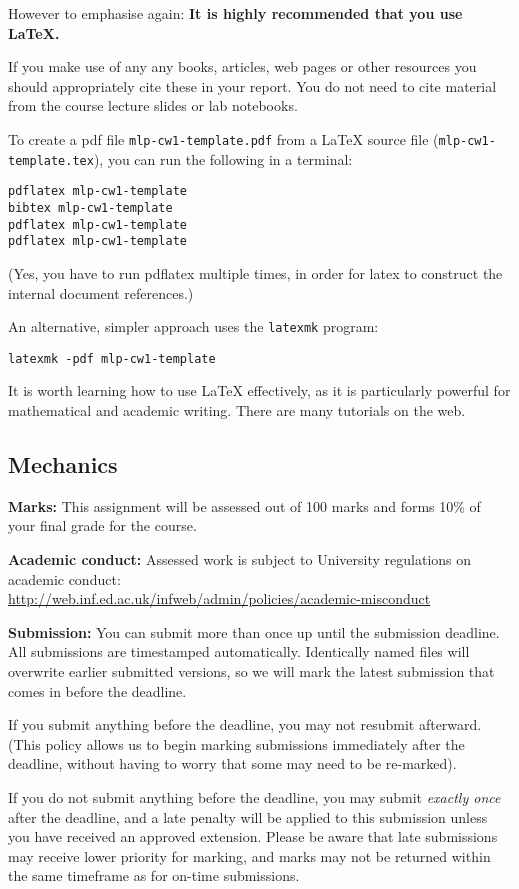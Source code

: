\documentclass[11pt,]{article}
\begin{document}
However to emphasise again: \textbf{It is highly recommended that you use LaTeX.}

If you make use of any any books, articles, web pages or other resources
you should appropriately cite these in your report. You do not need to
cite material from the course lecture slides or lab notebooks.

To create a pdf file \verb+mlp-cw1-template.pdf+ from a LaTeX source file (\verb+mlp-cw1-template.tex+), you can run the following in a terminal:
\begin{verbatim}
pdflatex mlp-cw1-template
bibtex mlp-cw1-template
pdflatex mlp-cw1-template
pdflatex mlp-cw1-template
\end{verbatim}
(Yes, you have to run pdflatex multiple times, in order  for latex to construct the internal document references.)

An alternative, simpler approach uses the \verb+latexmk+ program:
\begin{verbatim}
latexmk -pdf mlp-cw1-template
\end{verbatim}

It is worth learning how to use LaTeX effectively, as it is particularly powerful for mathematical and academic writing.  There are many tutorials on the web.


\subsection{Mechanics}
\label{sec:mechanics}

\textbf{Marks:} 
This assignment will be assessed out of 100 marks and
forms 10\% of your final grade for the course.

\textbf{Academic conduct:} 
Assessed work is subject to University
regulations on academic
conduct:\\\url{http://web.inf.ed.ac.uk/infweb/admin/policies/academic-misconduct}

\textbf{Submission:} 
You can submit more than once up until the submission deadline. All
submissions are timestamped automatically. Identically named files
will overwrite earlier submitted versions, so we will mark the latest
submission that comes in before the deadline.

If you submit anything before the deadline, you may not resubmit
afterward. (This policy allows us to begin marking submissions
immediately after the deadline, without having to worry that some may
need to be re-marked).

If you do not submit anything before the deadline, you may submit {\em
exactly once} after the deadline, and a late penalty will be applied
to this submission unless you have received an approved extension.
Please be aware that late submissions may receive lower priority for
marking, and marks may not be returned within the same timeframe as
for on-time submissions.
\end{document}
